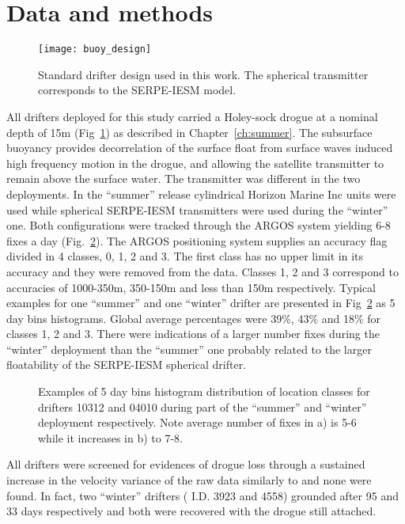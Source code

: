 \section{Data and methods}
\begin{figure}
\centering \arribacap
\texttt{[image: buoy\_design]}%
\caption{Standard drifter design used in this work. The spherical
transmitter corresponds to the SERPE-IESM model.} %
\label{fig:drf_design}
\end{figure}
All drifters deployed for this study carried a Holey-sock drogue
at a nominal depth of 15m (Fig~\ref{fig:drf_design}) as described
in Chapter~\ref{ch:summer}. The subsurface buoyancy provides
decorrelation of the surface float from surface waves induced high
frequency motion in the drogue,  and allowing the satellite
transmitter to remain above the surface water. The transmitter was
different in the two deployments. In the ``summer'' release
cylindrical Horizon Marine Inc units were used while spherical
SERPE-IESM transmitters were used during the ``winter'' one. Both
configurations were tracked through the ARGOS system yielding 6-8
fixes a day (Fig.~\ref{fig:drf_classes}). The ARGOS positioning
system supplies an accuracy flag divided in 4 classes, 0, 1, 2 and
3. The first class has no upper limit in its accuracy and they
were removed from the data. Classes 1, 2 and 3 correspond to
accuracies of 1000-350m, 350-150m and less than 150m respectively.
Typical examples for one ``summer'' and one ``winter'' drifter are
presented in Fig~\ref{fig:drf_classes} as 5 day bins histograms.
Global average percentages were 39\%, 43\% and 18\% for classes 1,
2 and 3. There were indications of a larger number fixes during
the ``winter'' deployment than the ``summer'' one probably related
to the larger floatability of the SERPE-IESM spherical drifter.
\begin{figure}
\centering \arribacap {}%
%
\caption{Examples of 5 day bins histogram distribution of location
classes for drifters 10312 and 04010 during part of the ``summer''
and ``winter'' deployment respectively. Note average number of
fixes in a) is 5-6 while it increases in b) to 7-8.}
\label{fig:drf_classes}
\end{figure}

All drifters were screened for evidences of drogue loss through a
sustained increase in the velocity variance of the raw data
similarly to \citet{Burrows99} and none were found. In fact, two
``winter'' drifters ( I.D. 3923 and 4558) grounded after 95 and 33
days respectively and both were recovered with the drogue still
attached.

